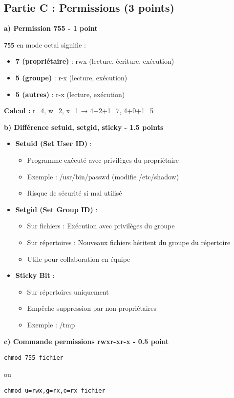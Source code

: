 \documentclass[12pt,a4paper]{article}
\begin{document}
\subsection*{Partie C : Permissions (3 points)}

\begin{answerbox}
\textbf{a) Permission 755 - 1 point}

\texttt{755} en mode octal signifie :
\begin{itemize}
    \item \textbf{7 (propriétaire)} : rwx (lecture, écriture, exécution)
    \item \textbf{5 (groupe)} : r-x (lecture, exécution)
    \item \textbf{5 (autres)} : r-x (lecture, exécution)
\end{itemize}

\textbf{Calcul :} r=4, w=2, x=1 → 4+2+1=7, 4+0+1=5

\textbf{b) Différence setuid, setgid, sticky - 1.5 points}

\begin{itemize}
    \item \textbf{Setuid (Set User ID)} :
    \begin{itemize}
        \item Programme exécuté avec privilèges du propriétaire
        \item Exemple : /usr/bin/passwd (modifie /etc/shadow)
        \item Risque de sécurité si mal utilisé
    \end{itemize}
    \item \textbf{Setgid (Set Group ID)} :
    \begin{itemize}
        \item Sur fichiers : Exécution avec privilèges du groupe
        \item Sur répertoires : Nouveaux fichiers héritent du groupe du répertoire
        \item Utile pour collaboration en équipe
    \end{itemize}
    \item \textbf{Sticky Bit} :
    \begin{itemize}
        \item Sur répertoires uniquement
        \item Empêche suppression par non-propriétaires
        \item Exemple : /tmp
    \end{itemize}
\end{itemize}

\textbf{c) Commande permissions rwxr-xr-x - 0.5 point}

\begin{lstlisting}
chmod 755 fichier
\end{lstlisting}

ou

\begin{lstlisting}
chmod u=rwx,g=rx,o=rx fichier
\end{lstlisting}
\end{answerbox}
\end{document}

